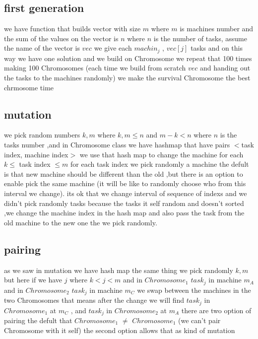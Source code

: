 \documentclass[11pt,fullpage]{article}
\begin{document}
\subsection{first generation}
we have function that builds vector with size $m$ where $m$ is machines number and the sum of the values on the vector is $n$ where $n$ is the number of tasks, assume the name of the vector is $vec$ we give each $machin_j$ , $vec[j]$ tasks and on this way we have one solution and we build on Chromosome we repeat that 100 times making 100 Chromosomes (each time we build from scratch  $vec$ and handing out the tasks to the machines randomly) we make the survival Chromosome the best chrmosome  time
\subsection{mutation}
we pick random numbers $k,m$ where $k,m \leq n$ and $m-k <n$ where $n$ is the tasks number ,and in Chromosome class we have hashmap that have pairs $<$task index, machine index$>$ we use that hash map to change the machine for each $k\leq$ task index $\leq m$ for each task index we pick randomly a machine the defult is that new machine should be different than the old ,but there is an option to enable pick the same machine (it will be like to randomly choose who from this interval we change).\newline
its ok that we  change   interval of sequence of indexs and we didn't  pick randomly tasks because the tasks it self random and doesn't sorted ,we change the machine index in the hash map and also pass the task from the old machine to the new one the we pick randomly.\newline
 \subsection{pairing}
as we saw in mutation we have hash map the same thing we pick randomly $k,m$ but here if we have $j$ where $k<j<m$ and in $Chromosome_1$  $task_j$ in machine $m_A$ and in $Chromosome_2$  $task_j$ in machine $m_C$ we swap between the machines in the two Chromosomes that means after the change we will find $task_j$ in $Chromosome_1$ at $m_C$ , and $task_j$ in $Chromosome_2$ at $m_A$
there are two option of pairing the defult that $Chromosome_1$ $\neq$  $Chromosome_1$ (we can't pair Chromosome with it self) the second option allows that as kind of mutation
\end{document}
